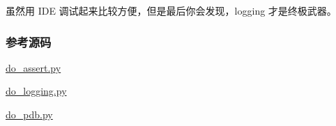 虽然用 IDE 调试起来比较方便，但是最后你会发现，logging 才是终极武器。

\hypertarget{ux53c2ux8003ux6e90ux7801}{%
\subsubsection{参考源码}\label{ux53c2ux8003ux6e90ux7801}}

\href{https://github.com/michaelliao/learn-python3/blob/master/samples/debug/do_assert.py}{do\_assert.py}

\href{https://github.com/michaelliao/learn-python3/blob/master/samples/debug/do_logging.py}{do\_logging.py}

\href{https://github.com/michaelliao/learn-python3/blob/master/samples/debug/do_pdb.py}{do\_pdb.py}

